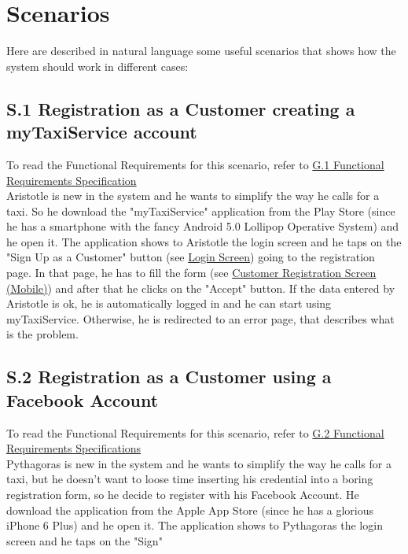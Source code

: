 \documentclass{report}
\begin{document}
	\section{Scenarios}
	Here are described in natural language some useful scenarios that shows how the system should work in different cases:

		\subsection{S.1 Registration as a Customer creating a myTaxiService account}\label{sec:NormalCustomerRegistrationScenario}
		To read the Functional Requirements for this scenario, refer to \hyperref[sec:frs1]{G.1 Functional Requirements Specification}\\

		Aristotle is new in the system and he wants to simplify the way he calls for a taxi. So he download the "myTaxiService" application from the Play Store (since he has a smartphone with the fancy Android 5.0 Lollipop Operative System) and he open it.
		The application shows to Aristotle the login screen and he taps on the "Sign Up as a Customer" button (see \hyperref[login_m]{Login Screen}) going to the registration page. In that page, he has to fill the form (see \hyperref[cregistration_m]{Customer Registration Screen (Mobile)}) and after that he clicks on the "Accept" button. If the data entered by Aristotle is ok, he is automatically logged in and he can start using myTaxiService. Otherwise, he is redirected to an error page, that describes what is the problem. 

		\subsection{S.2 Registration as a Customer using a Facebook Account}\label{sec:FacebookCustomerRegistrationScenario}
		To read the Functional Requirements for this scenario, refer to \hyperref[sec:frs2]{G.2 Functional Requirements Specifications}\\

		Pythagoras is new in the system and he wants to simplify the way he calls for a taxi, but he doesn't want to loose time inserting his credential into a boring registration form, so he decide to register with his Facebook Account.
		He download the application from the Apple App Store (since he has a glorious iPhone 6 Plus) and he open it.
		The application shows to Pythagoras the login screen and he taps on the "Sign" 
\end{document}

